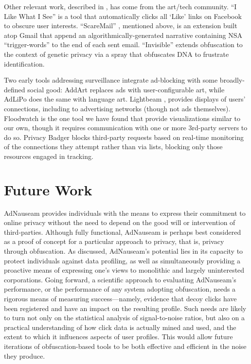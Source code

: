 \documentclass[conference]{IEEEtran}
\begin{document}
Other relevant work, described in \cite{Howe-3}, has come from the art/tech community. “I Like What I See” is a tool  that automatically clicks all ‘Like’ links on Facebook to obscure user interests. “ScareMail” \cite{Grosser}, mentioned above, is an extension built atop Gmail that append an algorithmically-generated narrative containing NSA “trigger-words” to the end of each sent email. “Invisible”\cite{Hagborg} extends obfuscation to the context of genetic privacy via a spray that obfuscates DNA to frustrate identification.

Two early tools addressing surveillance integrate ad-blocking with some broadly-defined social good: AddArt \cite{AddArt} replaces ads with user-configurable art, while AdLiPo \cite{Howe-0} does the same with language art. Lightbeam \cite{Mozilla}, provides displays of users' connections, including to advertising networks (though not ads themselves). Floodwatch \cite{Floodwatch} is the one tool we have found that provide visualizations similar to our own, though it requires communication with one or more 3rd-party servers to do so. Privacy Badger \cite{EFF-0} blocks third-party requests based on real-time monitoring of the connections they attempt rather than via lists, blocking only those resources engaged in tracking.

\section{Future Work}

AdNauseam provides individuals with the means to express their commitment to online privacy without the need to depend on the good will or intervention of third-parties. Although fully functional, AdNauseam is perhaps best considered as a proof of concept for a particular approach to privacy, that is, privacy through obfuscation. As discussed, AdNauseam's potential lies in its capacity to protect individuals against data profiling, as well as simultaneously providing a proactive means of expressing one's views to monolithic and largely uninterested corporations. Going forward, a scientific approach to evaluating AdNauseam's performance, or the performance of any system adopting obfuscation, needs a rigorous means of measuring success---namely, evidence that decoy clicks have been registered and have an impact on the resulting profile. Such needs are likely to turn not only on the statistical analysis of signal-to-noise ratios, but also on a practical understanding of how click data is actually mined and used, and the extent to which it influences aspects of user profiles. This would allow future iterations of obfuscation-based tools to be both effective and efficient in the noise they produce.
\end{document}
